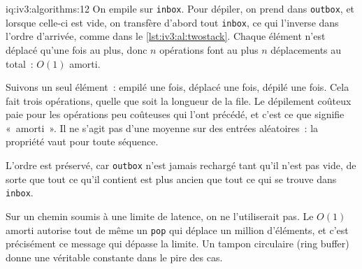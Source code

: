 \begin{solution}{iq:iv3:algorithms:12}
On empile sur \texttt{inbox}. Pour dépiler, on prend dans \texttt{outbox}, et lorsque celle-ci est vide, on transfère d'abord tout \texttt{inbox}, ce qui l'inverse dans l'ordre d'arrivée, comme dans le \cref{lst:iv3:al:twostack}. Chaque élément n'est déplacé qu'une fois au plus, donc $n$ opérations font au plus $n$ déplacements au total~: $O(1)$ amorti.
\label{lst:iv3:al:twostack}

Suivons un seul élément~: empilé une fois, déplacé une fois, dépilé une fois. Cela fait trois opérations, quelle que soit la longueur de la file. Le dépilement coûteux paie pour les opérations peu coûteuses qui l'ont précédé, et c'est ce que signifie «~amorti~». Il ne s'agit pas d'une moyenne sur des entrées aléatoires~: la propriété vaut pour toute séquence.

L'ordre est préservé, car \texttt{outbox} n'est jamais rechargé tant qu'il n'est pas vide, de sorte que tout ce qu'il contient est plus ancien que tout ce qui se trouve dans \texttt{inbox}.

Sur un chemin soumis à une limite de latence, on ne l'utiliserait pas. Le $O(1)$ amorti autorise tout de même un \texttt{pop} qui déplace un million d'éléments, et c'est précisément ce message qui dépasse la limite. Un tampon circulaire (ring buffer) donne une véritable constante dans le pire des cas.

\end{solution}

